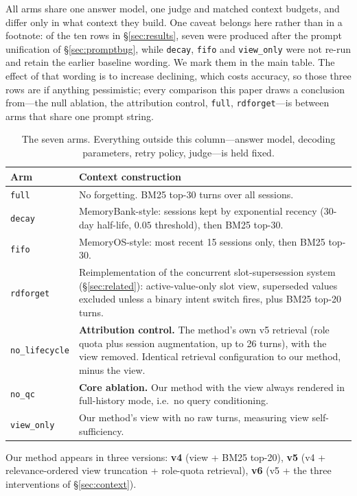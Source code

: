 \documentclass[11pt]{article}
\newcommand{\arm}[1]{\texttt{#1}}
\begin{document}
All arms share one answer model, one judge and matched context budgets, and differ only in what context they build. One caveat belongs here rather than in a footnote: of the ten rows in \S\ref{sec:results}, seven were produced after the prompt unification of \S\ref{sec:promptbug}, while \arm{decay}, \arm{fifo} and \arm{view\_only} were not re-run and retain the earlier baseline wording. We mark them in the main table. The effect of that wording is to increase declining, which costs accuracy, so those three rows are if anything pessimistic; every comparison this paper draws a conclusion from---the null ablation, the attribution control, \arm{full}, \arm{rdforget}---is between arms that share one prompt string.

\begin{table}[ht]
\centering
\small
\begin{tabular}{@{}lp{10.6cm}@{}}
\toprule
\textbf{Arm} & \textbf{Context construction} \\
\midrule
\arm{full} & No forgetting. BM25 top-30 turns over all sessions. \\
\arm{decay} & MemoryBank-style: sessions kept by exponential recency (30-day half-life, $0.05$ threshold), then BM25 top-30. \\
\arm{fifo} & MemoryOS-style: most recent 15 sessions only, then BM25 top-30. \\
\arm{rdforget} & Reimplementation of the concurrent slot-supersession system (\S\ref{sec:related}): active-value-only slot view, superseded values excluded unless a binary intent switch fires, plus BM25 top-20 turns. \\
\arm{no\_lifecycle} & \textbf{Attribution control.} The method's own v5 retrieval (role quota plus session augmentation, up to 26 turns), with the view removed. Identical retrieval configuration to our method, minus the view. \\
\arm{no\_qc} & \textbf{Core ablation.} Our method with the view always rendered in full-history mode, i.e.\ no query conditioning. \\
\arm{view\_only} & Our method's view with no raw turns, measuring view self-sufficiency. \\
\bottomrule
\end{tabular}
\caption{The seven arms. Everything outside this column---answer model, decoding parameters, retry policy, judge---is held fixed.}
\label{tab:arms}
\end{table}

Our method appears in three versions: \textbf{v4} (view + BM25 top-20), \textbf{v5} (v4 + relevance-ordered view truncation + role-quota retrieval), \textbf{v6} (v5 + the three interventions of \S\ref{sec:context}).
\end{document}

